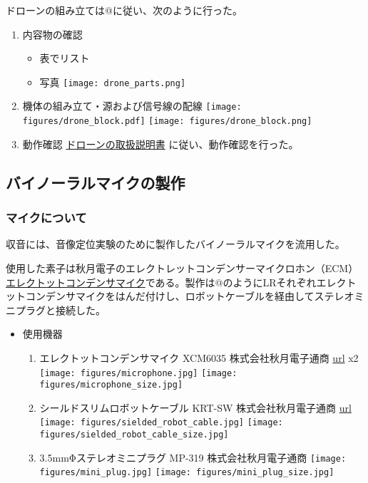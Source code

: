 ドローンの組み立ては@に従い、次のように行った。

\begin{enumerate}
\def\labelenumi{\arabic{enumi}.}
\item
  内容物の確認

  \begin{itemize}
  \tightlist
  \item
    表でリスト
  \item
    写真 \texttt{[image: drone\_parts.png]}
  \end{itemize}
\item
  機体の組み立て・源および信号線の配線
  \texttt{[image: figures/drone\_block.pdf]}
  \texttt{[image: figures/drone\_block.png]}
\item
  動作確認
  \href{http://www.lynxmotion.com/images/document/PDF/LynxmotionUAV-QuadrinoNano-UserGuideV1.1.pdf}{ドローンの取扱説明書}
  に従い、動作確認を行った。
\end{enumerate}

\hypertarget{ux30d0ux30a4ux30ceux30fcux30e9ux30ebux30deux30a4ux30afux306eux88fdux4f5c}{%
\subsection{バイノーラルマイクの製作}\label{ux30d0ux30a4ux30ceux30fcux30e9ux30ebux30deux30a4ux30afux306eux88fdux4f5c}}

\hypertarget{ux30deux30a4ux30afux306bux3064ux3044ux3066}{%
\subsubsection{マイクについて}\label{ux30deux30a4ux30afux306bux3064ux3044ux3066}}

収音には、音像定位実験のために製作したバイノーラルマイクを流用した。

使用した素子は秋月電子のエレクトレットコンデンサーマイクロホン（ECM）\href{http://akizukidenshi.com/catalog/g/gP-08181/}{エレクトットコンデンサマイク}である。製作は@のようにLRそれぞれエレクトットコンデンサマイクをはんだ付けし、ロボットケーブルを経由してステレオミニプラグと接続した。

\begin{itemize}
\tightlist
\item
  使用機器

  \begin{enumerate}
  \def\labelenumi{\arabic{enumi}.}
  \item
    エレクトットコンデンサマイク XCM6035 株式会社秋月電子通商
    \href{http://akizukidenshi.com/catalog/g/gP-08181/}{url} x2
    \texttt{[image: figures/microphone.jpg]}
    \texttt{[image: figures/microphone\_size.jpg]}
  \item
    シールドスリムロボットケーブル KRT-SW 株式会社秋月電子通商
    \href{http://akizukidenshi.com/catalog/g/gP-07457/}{url}
    \texttt{[image: figures/sielded\_robot\_cable.jpg]}
    \texttt{[image: figures/sielded\_robot\_cable\_size.jpg]}
  \item
    3.5mmΦステレオミニプラグ MP-319 株式会社秋月電子通商
    \texttt{[image: figures/mini\_plug.jpg]}
    \texttt{[image: figures/mini\_plug\_size.jpg]}
  \end{enumerate}
\end{itemize}

